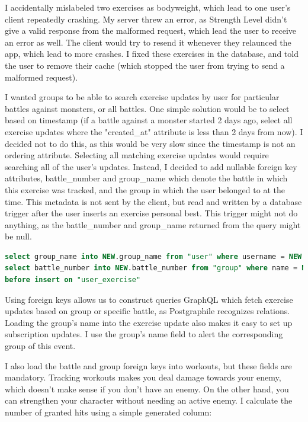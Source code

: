 \documentclass{l4proj}
\begin{document}
I accidentally mislabeled two exercises as bodyweight, which lead to one user's client repeatedly crashing. My server threw an error, as Strength Level didn't give a valid response from the malformed request, which lead the user to receive an error as well. The client would try to resend it whenever they relaunced the app, which lead to more crashes. I fixed these exercises in the database, and told the user to remove their cache (which stopped the user from trying to send a malformed request).

I wanted groups to be able to search exercise updates by user for particular battles against monsters, or all battles. One simple solution would be to select based on timestamp (if a battle against a monster started 2 days ago, select all exercise updates where the "created\_at" attribute is less than 2 days from now). I decided not to do this, as this would be very slow since the timestamp is not an ordering attribute. Selecting all matching exercise updates would require searching all of the user's updates. Instead, I decided to add nullable foreign key attributes, battle\_number and group\_name which denote the battle in which this exercise was tracked, and the group in which the user belonged to at the time. This metadata is not sent by the client, but read and written by a database trigger after the user inserts an exercise personal best. This trigger might not do anything, as the battle\_number and group\_name returned from the query might be null.

\begin{lstlisting}[language=SQL, caption={This selects the group and battle of the user that created this exercise update}, label=lst:trigger_set_metadata]
select group_name into NEW.group_name from "user" where username = NEW.username;
select battle_number into NEW.battle_number from "group" where name = NEW.group_name;
before insert on "user_exercise"
\end{lstlisting}


Using foreign keys allows us to construct queries GraphQL which fetch exercise updates based on group or specific battle, as Postgraphile recognizes relations. Loading the group's name into the exercise update also makes it easy to set up subscription updates. I use the group's name field to alert the corresponding group of this event.

I also load the battle and group foreign keys into workouts, but these fields are mandatory. Tracking workouts makes you deal damage towards your enemy, which doesn't make sense if you don't have an enemy. On the other hand, you can strengthen your character without needing an active enemy. I calculate the number of granted hits using a simple generated column:
\end{document}
